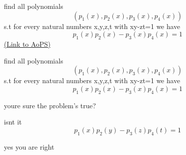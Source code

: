 \begin{problem}
	find all polynomials \[(p_{1}(x),p_{2}(x),p_{3}(x),p_{4}(x))\] s.t for every natural numbers x,y,z,t with xy-zt=1 we have  \[p_{1}(x)p_{2}(x)-p_{3}(x)p_{4}(x)=1\]
	\flushright \href{https://artofproblemsolving.com/community/c6h586461}{(Link to AoPS)}
\end{problem}



\begin{solution}
	\begin{tcolorbox}find all polynomials \[(p_{1}(x),p_{2}(x),p_{3}(x),p_{4}(x))\] s.t for every natural numbers x,y,z,t with xy-zt=1 we have  \[p_{1}(x)p_{2}(x)-p_{3}(x)p_{4}(x)=1\]\end{tcolorbox}

youre sure the problem's true?

isnt it \[p_{1}(x)p_{2}(y)-p_{3}(z)p_{4}(t)=1\]
\end{solution}



\begin{solution}
	yes you are right
\end{solution}



